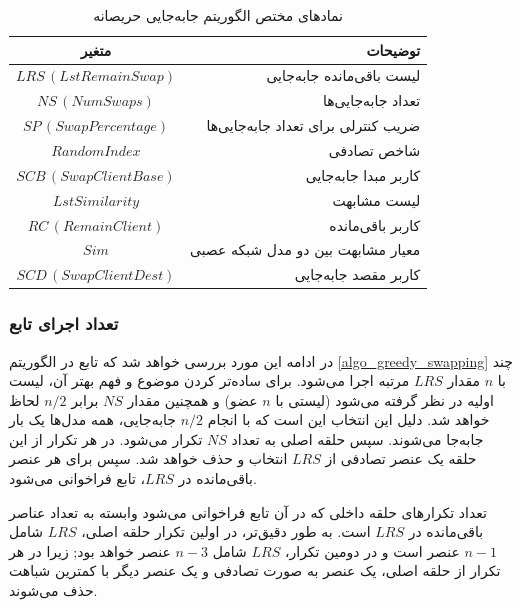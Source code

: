 \begin{table}[h]
	\centering
	\caption{نمادهای مختص الگوریتم جابه‌جایی حریصانه}
	\label{tabel_GreedySwappingNotations}
	\begin{tabular}{cr}
		\hline
		متغیر & توضیحات \\
		\hline
		$LRS \, (LstRemainSwap)$ & لیست باقی‌مانده جابه‌جایی \\
		$NS \, (NumSwaps)$ & تعداد جابه‌جایی‌ها \\
		$SP \, (SwapPercentage)$ & ضریب کنترلی برای تعداد جابه‌جایی‌ها \\
		$RandomIndex$ & شاخص تصادفی \\
		$SCB \, (SwapClientBase)$ & کاربر مبدا جابه‌جایی \\
		$LstSimilarity$ & لیست مشابهت \\
		$RC \, (RemainClient)$ & کاربر باقی‌مانده \\
		$Sim$ & معیار مشابهت بین دو مدل شبکه عصبی \\
		$SCD \, (SwapClientDest)$ & کاربر مقصد جابه‌جایی \\
	\end{tabular}
\end{table}


\vspace{3mm}
\subsubsection{
	تعداد اجرای تابع
}\label{sec_counting_model_similarity}\vspace{-1mm}
در ادامه این مورد بررسی خواهد شد که تابع
در الگوریتم
\ref{algo_greedy_swapping}
چند مرتبه اجرا می‌شود. 
برای ساده‌تر کردن موضوع و فهم بهتر آن، لیست ‎\(LRS\) با \( n \) مقدار اولیه در نظر گرفته می‌شود (لیستی با \( n \) عضو) و همچنین مقدار \( NS \) برابر \( n/2 \) لحاظ خواهد شد. دلیل این انتخاب این است که با انجام \( n/2 \) جابه‌جایی، همه مدل‌ها یک بار جابه‌جا می‌شوند.
سپس حلقه اصلی به تعداد \( NS \) تکرار می‌شود. در هر تکرار از این حلقه یک عنصر تصادفی از \( LRS \) انتخاب و حذف خواهد شد. سپس برای هر عنصر باقی‌مانده در \( LRS \)، تابع
فراخوانی می‌شود.

تعداد تکرارهای حلقه داخلی که در آن تابع
فراخوانی می‌شود وابسته به تعداد عناصر باقی‌مانده در \( LRS \) است. به طور دقیق‌تر، در اولین تکرار حلقه اصلی، \( LRS \) شامل \(n-1\) عنصر است و در دومین تکرار، \( LRS \) شامل \(n-3\) عنصر خواهد بود; زیرا در هر تکرار از حلقه اصلی، یک عنصر به صورت تصادفی و یک عنصر دیگر با کمترین شباهت حذف می‌شوند.

